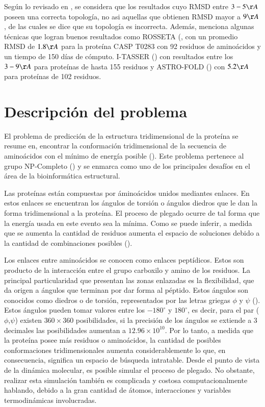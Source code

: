 Según lo revisado en \citealp{Zhang:2008}, se considera que los resultados cuyo RMSD entre $3-5\AA$ poseen una correcta topología, no asi aquellas que obtienen RMSD mayor a $9\AA$, de las cuales se dice que su topología es incorrecta. Además, menciona algunas técnicas que logran buenos resultados como ROSSETA (\citealp{Simons1997209}, con un promedio RMSD de $1.8\AA$ para la proteína CASP T0283 con 92 residuos de aminoácidos y un tiempo de 150 días de cómputo. I-TASSER (\citealp{PROT:PROT21702}) con resultados entre los $3-9\AA$ para proteínas de hasta 155 residuos y ASTRO-FOLD (\citealp{PROT:PROT20338}) con $5.2\AA$ para proteínas de 102 residuos.

\section{Descripci\'on del problema}
\label{intro:problema}

El problema de predicción de la estructura tridimensional de la proteína se resume en, encontrar la conformación tridimensional de la secuencia de aminoácidos con el mínimo de energía posible (\citealp{Anfinsen:1972}). Este problema pertenece al grupo NP-Completo (\citealp{Crescenzi:1998}) y se enmarca como uno de los principales desafíos en el área de la bioinformática estructural.

Las proteínas están compuestas por áminoácidos unidos mediantes enlaces. En estos enlaces se encuentran los ángulos de torsión o ángulos diedros que le dan la forma tridimensional a la proteína. El proceso de plegado ocurre de tal forma que la energía usada en este evento sea la mínima. Como se puede inferir, a medida que se aumenta la cantidad de residuos aumenta el espacio de soluciones debido a la cantidad de combinaciones posibles (\citealp{Zhang:2008}).

Los enlaces entre aminoácidos se conocen como enlaces peptídicos. Estos son producto de la interacción entre el grupo carboxilo y amino de los residuos. La principal particularidad que presentan las zonas enlazadas es la flexibilidad, que da origen a ángulos que terminan por dar forma al péptido. Estos ángulos son conocidos como diedros o de torsión, representados por las letras griegas $\phi$ y $\psi$ (\citealp{molecular:book}). Estos ángulos pueden tomar valores entre los $-180^{\circ}$ y $180^{\circ}$, es decir, para el par ($\phi$,$\psi$) existen $360{\times}360$ posibilidades, si la precisión de los ángulos se extiende a 3 decimales las posibilidades aumentan a $12.96{\times}10^{10}$. Por lo tanto, a medida que la proteína posee más residuos o aminoácidos, la cantidad de posibles conformaciones tridimensionales aumenta considerablemente lo que, en consecuencia, significa un espacio de búsqueda intratable. Desde el punto de vista de la dinámica molecular, es posible simular el proceso de plegado. No obstante, realizar esta simulación también es complicada y costosa computacionalmente hablando, debido a la gran cantidad de átomos, interacciones y variables termodinámicas involucradas. 


